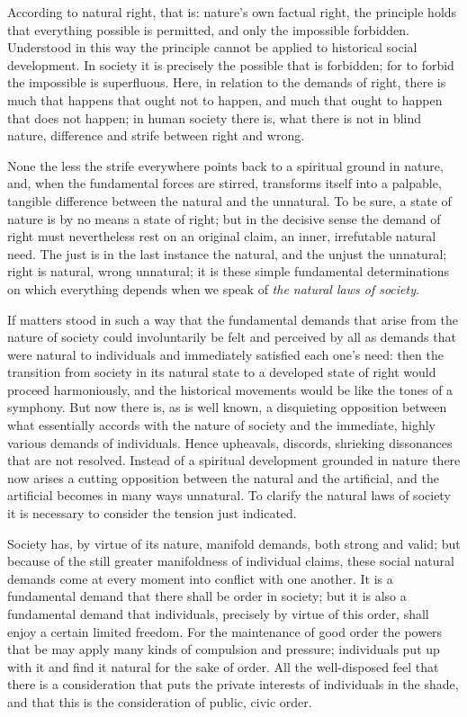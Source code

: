 \documentclass[12pt,a4paper,openany]{book}
\newcommand{\opage}[1]{\marginnote{\footnotesize\textit{[#1]}}}
\begin{document}
According to natural right, that is: nature's own factual
right, the principle holds that everything possible is permitted,
and only the impossible forbidden. Understood in this way the principle
cannot be applied to historical social development.
In society it is precisely the possible that is forbidden;
for to forbid the impossible is superfluous. Here, in relation
to the demands of right, there is much that happens that
ought not to happen, and much that ought to happen that does not
happen; in human society there is, what there
is not in blind nature, difference and strife between
right and wrong.

None the less the strife everywhere points back to a
spiritual ground in nature, and, when the fundamental forces
are stirred, transforms itself into a palpable, tangible difference between
the natural and the unnatural. To be sure, a state of nature
is by no means a state of right; but in the decisive sense
the demand of right must nevertheless rest on an original claim,
an inner, irrefutable natural need. The just is in the
last instance the natural, and the unjust the unnatural;
right is natural, wrong unnatural; it is these simple
fundamental determinations on which everything depends when
we speak of \emph{the natural laws of society}.

If matters stood in such a way that the fundamental demands
that arise from the nature of society could
involuntarily be felt and perceived by all as demands that
were natural to individuals and immediately satisfied
each one's need: then the transition from
society in its natural state to a developed state of right
would proceed harmoniously, and the historical movements would be like
\setcounter{footnote}{0}%
\opage{291}the tones of a symphony. But now there is, as is well known,
a disquieting opposition between what essentially accords
with the nature of society and the immediate, highly
various demands of individuals. Hence upheavals,
discords, shrieking dissonances that are not resolved.
Instead of a spiritual development grounded in nature there now arises
a cutting opposition between the natural
and the artificial, and the artificial becomes in many
ways unnatural. To clarify the natural laws
of society it is necessary to consider the tension
just indicated.

Society has, by virtue of its nature, manifold demands, both
strong and valid; but because of the still greater manifoldness
of individual claims, these social natural demands
come at every moment into conflict with one another.
It is a fundamental demand that there shall
be order in society; but it is also a fundamental demand
that individuals, precisely by virtue of this order,
shall enjoy a certain limited freedom. For the maintenance of good
order the powers that be may apply many
kinds of compulsion and pressure; individuals put up with it and find
it natural for the sake of order. All the well-disposed feel
that there is a consideration that puts the private interests of individuals
in the shade, and that this is the consideration of public,
civic order.
\end{document}
